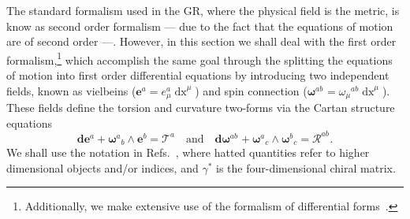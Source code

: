 \documentclass{ws-mpla}
\newcommand{\df}[1][]{\mathbf{d}{#1}}
\newcommand{\ga}{\gamma}
\newcommand{\we}{{\scriptstyle\wedge}}
\newcommand\vi[2]{e^{{#1}}_{{#2}}}
\newcommand\vif[1]{\boldsymbol{e}^{{#1}}}
\newcommand\spi[1]{\omega_{{#1}}}
\newcommand\spif[2]{{\boldsymbol{\omega}}^{{#1}}{}_{{#2}}}
\newcommand{\Rif}[2]{\boldsymbol{\mathcal{R}}^{{#1}}{}_{{#2}}}
\newcommand{\Tf}[1]{\boldsymbol{\mathcal{T}}^{#1}}
\renewcommand{\(}{\left(}
\renewcommand{\)}{\right)}
\renewcommand{\[}{\left[}
\renewcommand{\]}{\right]}
\newcommand*{\de}[1]{\mathop{\mathrm{d}#1}\nolimits}
\begin{document}
The standard formalism used in the GR, where the physical field is the metric, is know as second order formalism --- due to the fact that the equations of motion are of second order ---. However, in this section we shall deal with the first order formalism,\footnote{Additionally, we make extensive use of the formalism of differential forms~\cite{Cartan-calc,Zanelli:2005sa}.} which accomplish the same goal through the splitting the equations of motion into first order differential equations  by introducing two independent fields, known as vielbeins \mbox{($\vif{a} = \vi{a}{\mu}\de{x}^\mu$)} and spin connection \mbox{($\spif{ab}{} = \spi{\mu}{}^{ab}\de{x}^\mu$).} These fields define the torsion and curvature two-forms via the Cartan structure equations
\begin{equation}
  \df[\vif{a}] + \spif{a}{b} \we \vif{b} = \Tf{a} \quad \text{and} \quad \df[\spif{ab}{}] + \spif{a}{c} \we \spif{b}{c} = \Rif{ab}{}.
\end{equation}
We shall use the notation in Refs.~, where hatted quantities refer to higher dimensional objects and/or indices, and $\ga^{*}$ is the four-dimensional chiral matrix.
\end{document}
